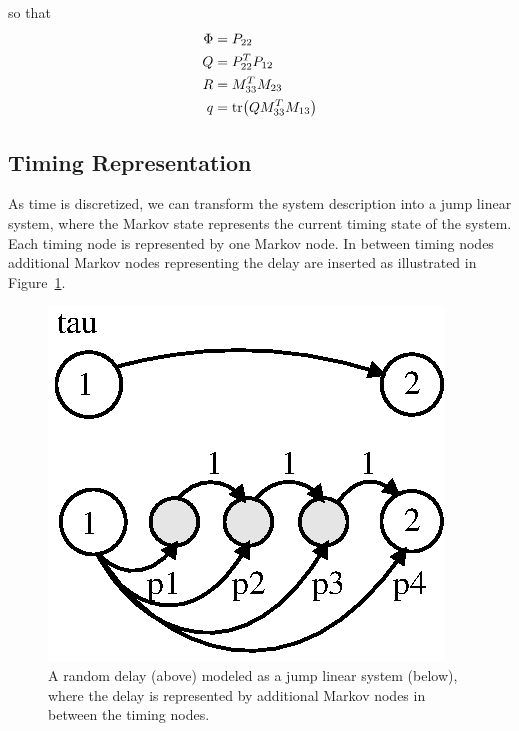 \documentclass[final,twoside]{rapport}  %
\begin{document}
\vspace{-1em}
so that
\begin{align*}
\Phi & = P_{22} \\
Q & = P_{22}^T P_{12}\\
R & = M_{33}^T M_{23}\\
q & = {\rm tr} \bigl ( Q M_{33}^T M_{13} \bigr )
\end{align*}
\subsection{Timing Representation}
As time is discretized, we can transform the system description into a
jump linear system, where the Markov state represents the current timing
state of the system. Each timing node is represented by one Markov
node. In between timing nodes additional Markov nodes representing
the delay are inserted as illustrated in Figure~\ref{fig:markovjump}.

\begin{figure}[tbp]
\center
{}
\includegraphics[scale=.8]{markovjump.ps}
\caption{A random delay (above) modeled as a jump linear system
  (below), where the delay is represented by additional Markov nodes
  in between the timing nodes.}
\label{fig:markovjump}
\end{figure}
\end{document}
